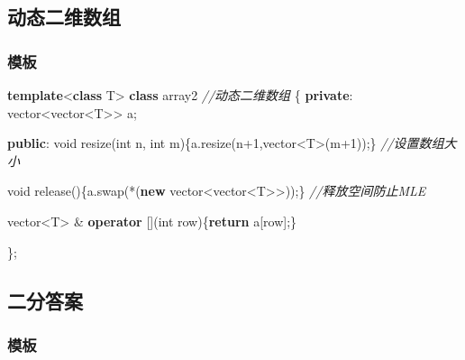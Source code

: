 \documentclass[
]{article}
\newenvironment{Shaded}{}{}
\newcommand{\CommentTok}[1]{\textcolor[rgb]{0.38,0.63,0.69}{\textit{#1}}}
\newcommand{\ControlFlowTok}[1]{\textcolor[rgb]{0.00,0.44,0.13}{\textbf{#1}}}
\newcommand{\DataTypeTok}[1]{\textcolor[rgb]{0.56,0.13,0.00}{#1}}
\newcommand{\DecValTok}[1]{\textcolor[rgb]{0.25,0.63,0.44}{#1}}
\newcommand{\KeywordTok}[1]{\textcolor[rgb]{0.00,0.44,0.13}{\textbf{#1}}}
\newcommand{\NormalTok}[1]{#1}
\begin{document}
\hypertarget{ux52a8ux6001ux4e8cux7ef4ux6570ux7ec4}{%
\subsection{动态二维数组}\label{ux52a8ux6001ux4e8cux7ef4ux6570ux7ec4}}

\hypertarget{ux6a21ux677f-17}{%
\subsubsection{模板}\label{ux6a21ux677f-17}}

\begin{Shaded}
\begin{Highlighting}[]
\KeywordTok{template}\NormalTok{\textless{}}\KeywordTok{class}\NormalTok{ T\textgreater{}}
\KeywordTok{class}\NormalTok{ array2 }\CommentTok{//动态二维数组}
\NormalTok{\{}
\KeywordTok{private}\NormalTok{:}
\NormalTok{    vector\textless{}vector\textless{}T\textgreater{}\textgreater{} a;}

\KeywordTok{public}\NormalTok{:}
    \DataTypeTok{void}\NormalTok{ resize(}\DataTypeTok{int}\NormalTok{ n, }\DataTypeTok{int}\NormalTok{ m)\{a.resize(n+}\DecValTok{1}\NormalTok{,vector\textless{}T\textgreater{}(m+}\DecValTok{1}\NormalTok{));\}}
    \CommentTok{//设置数组大小}

    \DataTypeTok{void}\NormalTok{ release()\{a.swap(*(}\KeywordTok{new}\NormalTok{ vector\textless{}vector\textless{}T\textgreater{}\textgreater{}));\}}
    \CommentTok{//释放空间防止MLE}

\NormalTok{    vector\textless{}T\textgreater{} \& }\KeywordTok{operator}\NormalTok{ [](}\DataTypeTok{int}\NormalTok{ row)\{}\ControlFlowTok{return}\NormalTok{ a[row];\}}

\NormalTok{\};}
\end{Highlighting}
\end{Shaded}

\hypertarget{ux4e8cux5206ux7b54ux6848}{%
\subsection{二分答案}\label{ux4e8cux5206ux7b54ux6848}}

\hypertarget{ux6a21ux677f-18}{%
\subsubsection{模板}\label{ux6a21ux677f-18}}
\end{document}
